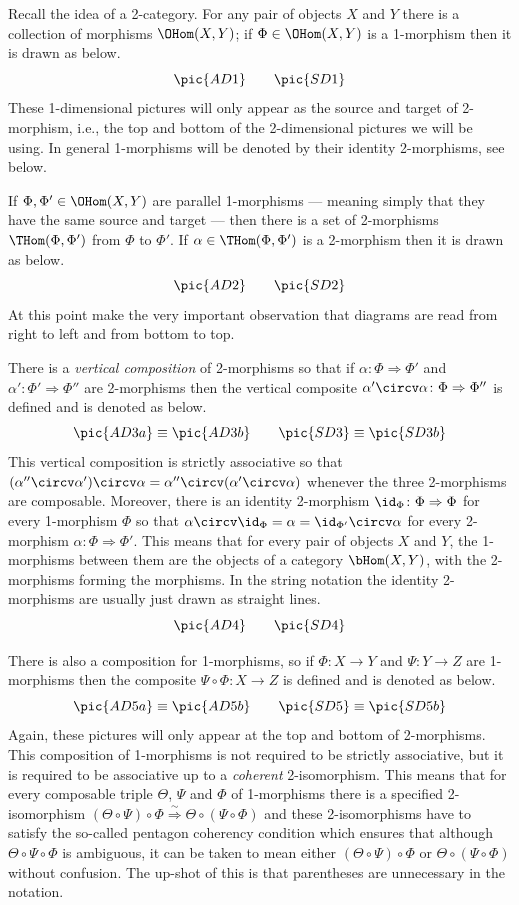Recall the idea of a 2-category.  For any pair of objects $X$ and $Y$
there is a collection of morphisms $\OHom(X,Y)$; if
$\Phi\in\OHom(X,Y)$ is a 1-morphism then it is drawn as below.
\[\pic{AD1}\qquad\pic{SD1}\]
These 1-dimensional pictures will only appear as the source and target
of 2-morphism, i.e., the top and bottom of the 2-dimensional pictures
we will be using.  In general 1-morphisms will be denoted by their
identity 2-morphisms, see below.


If $\Phi,\Phi'\in\OHom(X,Y)$ are parallel 1-morphisms --- meaning
simply that they have the same source and target --- then there is a
set of 2-morphisms $\THom(\Phi,\Phi')$ from $\Phi$ to $\Phi'$.  If
$\alpha\in\THom(\Phi,\Phi')$ is a 2-morphism then it is drawn as
below.
\[\pic{AD2}\qquad\pic{SD2}\]
At this point make the very important observation that diagrams are read from right to
left and from bottom to top.


There is a \emph{vertical composition} of 2-morphisms so that if
$\alpha\colon\Phi\Rightarrow\Phi'$ and
$\alpha'\colon\Phi'\Rightarrow\Phi''$ are 2-morphisms then the
vertical composite $\alpha'\circv\alpha\colon\Phi\Rightarrow\Phi''$ is
defined and is denoted as below.
\[\pic{AD3a}\equiv\pic{AD3b}\qquad\pic{SD3}\equiv\pic{SD3b}\]
This vertical composition is strictly associative so that
$(\alpha''\circv\alpha')\circv\alpha
=\alpha''\circv(\alpha'\circv\alpha)$ whenever the three 2-morphisms
are composable.  Moreover, there is an identity 2-morphism
$\id_\Phi\colon \Phi\Rightarrow \Phi$ for every 1-morphism $\Phi$ so
that $\alpha\circv\id_\Phi=\alpha=\id_{\Phi'}\circv\alpha$ for every
2-morphism $\alpha\colon\Phi\Rightarrow\Phi'$.  This means that for
every pair of objects $X$ and $Y$, the 1-morphisms between them are the
objects of a category $\bHom(X,Y)$, with the 2-morphisms forming the
morphisms.  In the string notation the identity 2-morphisms are usually just
drawn as straight lines.
\[\pic{AD4}\qquad\pic{SD4}\]


There is also a composition for 1-morphisms, so if $\Phi\colon X\to Y$
and $\Psi \colon Y\to Z$ are 1-morphisms then the composite $\Psi\circ
\Phi\colon X\to Z$ is defined and is denoted as below.
\[\pic{AD5a}\equiv\pic{AD5b}\qquad\pic{SD5}\equiv\pic{SD5b}\]
Again, these pictures will only appear at the top and bottom of
2-morphisms.  This composition of 1-morphisms is not required to be
strictly associative, but it is required to be associative up to a
\emph{coherent} 2-isomorphism.  This means that for every composable
triple $\Theta$, $\Psi$ and $\Phi$ of 1-morphisms there is a specified
2-isomorphism $(\Theta\circ\Psi)\circ\Phi
\stackrel\sim\Longrightarrow\Theta\circ(\Psi\circ\Phi)$ and these
2-isomorphisms have to satisfy the so-called pentagon coherency
condition which ensures that although $\Theta\circ\Psi\circ\Phi$ is
ambiguous, it can be taken to mean either $(\Theta\circ\Psi)\circ\Phi$
or $\Theta\circ(\Psi\circ\Phi)$ without confusion.  The up-shot of
this is that parentheses are unnecessary in the notation.


